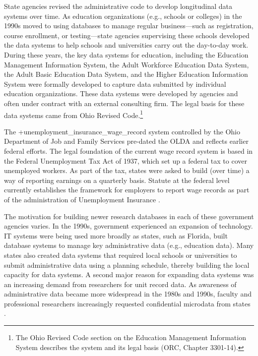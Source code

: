 \documentclass[
]{WileySix}
\begin{document}
State agencies revised the administrative code to develop longitudinal data systems over time. As education organizations (e.g., schools or colleges) in the 1990s moved to using databases to manage regular business---such as registration, course enrollment, or testing---state agencies supervising these schools developed the data systems to help schools and universities carry out the day-to-day work. During these years, the key data systems for education, including the Education Management Information System, the Adult Workforce Education Data System, the Adult Basic Education Data System, and the Higher Education Information System were formally developed to capture data submitted by individual education organizations. These data systems were developed by agencies and often under contract with an external consulting firm. The legal basis for these data systems came from Ohio Revised Code.\footnote{The Ohio Revised Code section on the Education Management Information System describes the system and its legal basis (ORC, Chapter 3301-14).}

The +unemployment\_insurance\_wage\_record\textbar{} system controlled by the Ohio Department of Job and Family Services pre-dated the OLDA and reflects earlier federal efforts. The legal foundation of the current wage record system is based in the Federal Unemployment Tax Act of 1937, which set up a federal tax to cover unemployed workers. As part of the tax, states were asked to build (over time) a way of reporting earnings on a quarterly basis. Statute at the federal level currently establishes the framework for employers to report wage records as part of the administration of Unemployment Insurance \citep{workforceinformationcouncil2014}.

The motivation for building newer research databases in each of these government agencies varies. In the 1990s, government experienced an expansion of technology. IT systems were being used more broadly as states, such as Florida, built database systems to manage key administrative data (e.g., education data). Many states also created data systems that required local schools or universities to submit administrative data using a planning schedule, thereby building the local capacity for data systems. A second major reason for expanding data systems was an increasing demand from researchers for unit record data. As awareness of administrative data became more widespread in the 1980s and 1990s, faculty and professional researchers increasingly requested confidential microdata from states \citep{borus1982, pfeiffer1998, stevens1989, stevens2012}.
\end{document}
